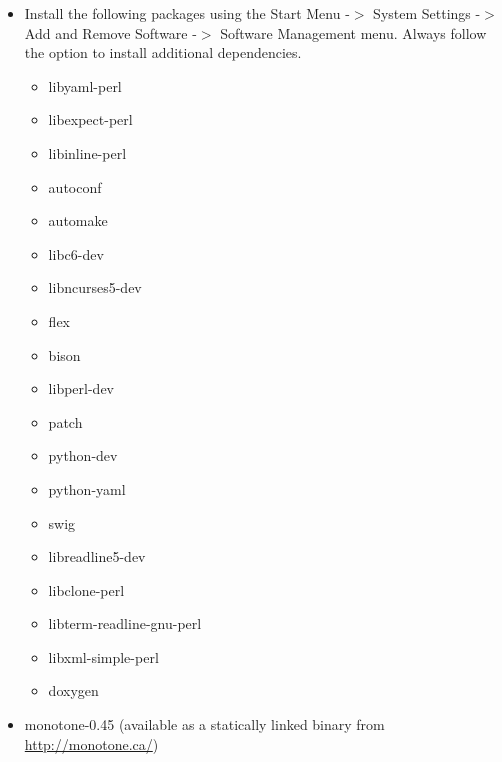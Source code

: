 \documentclass[12pt]{article}
\begin{document}
\begin{itemize}
\item[] Install the following packages using the Start Menu -$>$
  System Settings -$>$ Add and Remove Software -$>$ Software
  Management menu.  Always follow the option to install additional
  dependencies.
      \begin{itemize}
         \item libyaml-perl
         \item libexpect-perl
         \item libinline-perl
         \item autoconf
         \item automake
         \item libc6-dev
         \item libncurses5-dev
         \item flex
         \item bison
         \item libperl-dev
         \item patch
         \item python-dev
         \item python-yaml
         \item swig
         \item libreadline5-dev
         \item libclone-perl
         \item libterm-readline-gnu-perl
         \item libxml-simple-perl
         \item doxygen
      \end{itemize}
   \item[] monotone-0.45 (available as a statically linked binary from \href{http://monotone.ca/}{http://monotone.ca/})
 \end{itemize}
\end{document}

